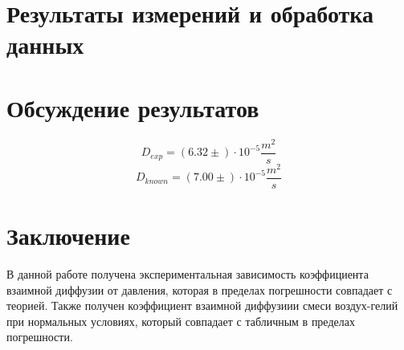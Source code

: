 \documentclass[1 pt]{article}
\begin{document}
\section{Результаты измерений и обработка данных}





\section{Обсуждение результатов}
\begin{equation*}
    D_{exp} = (6.32 \pm ) \cdot 10^{-5} \frac{m^2}{s}
\end{equation*}
\begin{equation*}
    D_{known} = (7.00 \pm ) \cdot 10^{-5} \frac{m^2}{s}
\end{equation*}
\section{Заключение}
В данной работе получена экспериментальная зависимость коэффициента взаимной диффузии от давления, которая в пределах погрешности совпадает с теорией. Также получен коэффициент взаимной диффузиии смеси воздух-гелий при нормальных условиях, который совпадает с табличным в пределах погрешности.
\end{document}
